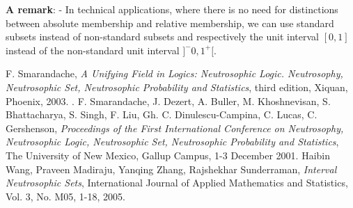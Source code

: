 \documentclass[12pt]{article}
\begin{document}
{\bf A remark}:
\newline - In technical applications, where there is no need for distinctions between absolute membership and relative membership, we can use standard subsets instead of non-standard subsets and respectively the unit interval $[0,1]$ instead of the non-standard unit interval $]^-0, 1^+[$.

\begin{thebibliography}{9}
 F. Smarandache, {\em A Unifying Field in Logics: Neutrosophic Logic. Neutrosophy, Neutrosophic Set, Neutrosophic Probability and Statistics}, third edition, Xiquan, Phoenix, 2003.
.
 F. Smarandache, J. Dezert, A. Buller, M. Khoshnevisan, S. Bhattacharya, S. Singh, F. Liu, Gh. C. Dinulescu-Campina, C. Lucas, C. Gershenson, {\em Proceedings of the First International Conference on Neutrosophy, Neutrosophic Logic, Neutrosophic Set, Neutrosophic Probability and Statistics}, The University of New Mexico, Gallup Campus, 1-3 December 2001.
 Haibin Wang, Praveen Madiraju, Yanqing Zhang, Rajshekhar Sunderraman, {\em Interval Neutrosophic Sets}, International Journal of Applied Mathematics and Statistics, Vol. 3, No. M05, 1-18, 2005.
\end{thebibliography}
\end{document}
